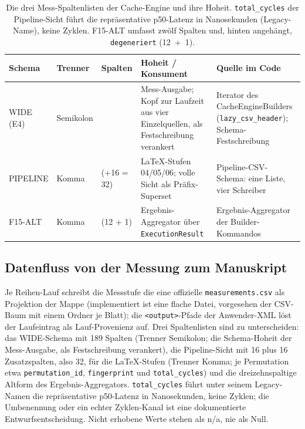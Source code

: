 \begin{nurlang}
\begin{table}[htbp]
\begin{tabular}{@{}l>{\raggedright\arraybackslash}p{1.5cm}>{\raggedright\arraybackslash}p{1.9cm}>{\raggedright\arraybackslash}p{4.6cm}>{\raggedright\arraybackslash}p{4.0cm}@{}}
\toprule
Schema & Trenner & Spalten & Hoheit / Konsument & Quelle im Code \\
\midrule
WIDE (E4) & Semikolon & 189 & Mess-Ausgabe; Kopf zur Laufzeit aus vier Einzelquellen, als Festschreibung verankert & Iterator des CacheEngineBuilders (\texttt{lazy\_csv\_header}); Schema-Festschreibung \\
PIPELINE & Komma & 16 (+16 = 32) & LaTeX-Stufen 04/05/06; volle Sicht als Präfix-Superset & Pipeline-CSV-Schema: eine Liste, vier Schreiber \\
F15-ALT & Komma & 13 (12 + 1) & Ergebnis-Aggregator über \texttt{ExecutionResult} & Ergebnis-Aggregator der Builder-Kommandos \\
\bottomrule
\end{tabular}
\caption{Die drei Mess-Spaltenlisten der Cache-Engine und ihre Hoheit. \texttt{total\_cycles} der
Pipeline-Sicht führt die repräsentative p50-Latenz in Nanosekunden (Legacy-Name), keine
Zyklen. F15-ALT umfasst zwölf Spalten und, hinten angehängt, \texttt{degeneriert} (12~+~1).}\label{tab:eval-schema-ebenen}
\end{table}
\end{nurlang}
\begin{nurkurz}
\subsection{Datenfluss von der Messung zum Manuskript}\label{sec:eval-dataflow}
Je Reihen-Lauf schreibt die Messstufe die eine offizielle \texttt{measurements.csv} als Projektion der
Mappe (implementiert ist eine flache Datei, vorgesehen der CSV-Baum mit einem Ordner je Blatt); die
\texttt{<output>}-Pfade der Anwender-XML löst der Laufeintrag als Lauf-Provenienz auf. Drei Spaltenlisten
sind zu unterscheiden: das WIDE-Schema mit 189 Spalten (Trenner Semikolon; die Schema-Hoheit der
Mess-Ausgabe, als Festschreibung verankert), die Pipeline-Sicht mit 16 plus 16 Zusatzspalten, also 32, für
die LaTeX-Stufen (Trenner Komma; je Permutation etwa \texttt{permutation\_id}, \texttt{fingerprint} und
\texttt{total\_cycles}) und die dreizehnspaltige Altform des Ergebnis-Aggregators. \texttt{total\_cycles}
führt unter seinem Legacy-Namen die repräsentative p50-Latenz in Nanosekunden, keine Zyklen; die
Umbenennung oder ein echter Zyklen-Kanal ist eine dokumentierte Entwurfsentscheidung. Nicht erhobene
Werte stehen als n/a, nie als Null.
\end{nurkurz}

